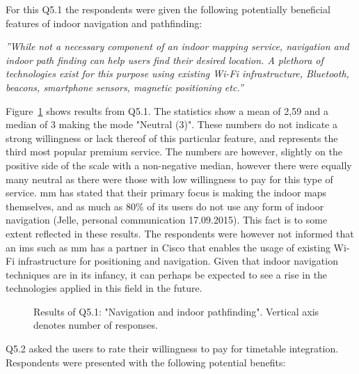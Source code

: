 For this Q5.1 the respondents were given the following potentially beneficial features of indoor navigation and pathfinding:

\begin{displayquote}
\textit{''While not a necessary component of an indoor mapping service, navigation and indoor path finding can help users find their desired location. A plethora of technologies exist for this purpose using existing Wi-Fi infrastructure, Bluetooth, beacons, smartphone sensors, magnetic positioning etc.''}
\end{displayquote}

Figure~\ref{fig:q51} shows results from Q5.1. The statistics show a mean of 2,59 and a median of 3 making the mode "Neutral (3)". These numbers do not indicate a strong willingness or lack thereof of this particular feature, and represents the third most popular premium service. The numbers are however, slightly on the positive side of the scale with a non-negative median, however there were equally many neutral as there were those with low willingness to pay for this type of service. \gls{mm} has stated that their primary focus is making the indoor maps themselves, and as much as 80\% of its users do not use any form of indoor navigation (Jelle, personal communication 17.09.2015). This fact is to some extent reflected in these results. The respondents were however not informed that an \gls{ims} such as \gls{mm} has a partner in Cisco that enables the usage of existing Wi-Fi infrastructure for positioning and navigation. Given that indoor navigation techniques are in its infancy, it can perhaps be expected to see a rise in the technologies applied in this field in the future. 

\begin{figure}[H]
    \centering
    \caption{Results of Q5.1: "Navigation and indoor pathfinding". Vertical axis denotes number of responses.}
    \label{fig:q51}
\end{figure}

Q5.2 asked the users to rate their willingness to pay for timetable integration. Respondents were presented with the following potential benefits:

